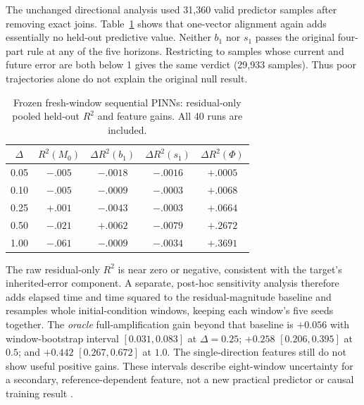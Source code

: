 \documentclass[11pt,a4paper]{article}
\begin{document}
The unchanged directional analysis used 31,360 valid predictor samples after removing exact joins. Table~\ref{tab:fresh} shows that one-vector alignment again adds essentially no held-out predictive value. Neither $b_1$ nor $s_1$ passes the original four-part rule at any of the five horizons. Restricting to samples whose current and future error are both below 1 gives the same verdict (29,933 samples). Thus poor trajectories alone do not explain the original null result.
\begin{table}[H]\centering\small
\caption{Frozen fresh-window sequential PINNs: residual-only pooled held-out $R^2$ and feature gains. All 40 runs are included.}\label{tab:fresh}
\begin{tabular}{@{}ccccc@{}}\toprule
$\Delta$ & $R^2(M_0)$ & $\Delta R^2(b_1)$ & $\Delta R^2(s_1)$ & $\Delta R^2(\Phi)$\\\midrule
0.05 & $-.005$ & $-.0018$ & $-.0016$ & $+.0005$\\
0.10 & $-.005$ & $-.0009$ & $-.0003$ & $+.0068$\\
0.25 & $+.001$ & $-.0043$ & $-.0003$ & $+.0664$\\
0.50 & $-.021$ & $+.0062$ & $-.0079$ & $+.2672$\\
1.00 & $-.061$ & $-.0009$ & $-.0034$ & $+.3691$\\\bottomrule
\end{tabular}
\end{table}
The raw residual-only $R^2$ is near zero or negative, consistent with the target's inherited-error component. A separate, post-hoc sensitivity analysis therefore adds elapsed time and time squared to the residual-magnitude baseline and resamples whole initial-condition windows, keeping each window's five seeds together. The \emph{oracle} full-amplification gain beyond that baseline is $+0.056$ with window-bootstrap interval $[0.031,0.083]$ at $\Delta=0.25$; $+0.258$ $[0.206,0.395]$ at $0.5$; and $+0.442$ $[0.267,0.672]$ at $1.0$. The single-direction features still do not show useful positive gains. These intervals describe eight-window uncertainty for a secondary, reference-dependent feature, not a new practical predictor or causal training result \cite{validation}.
\end{document}
